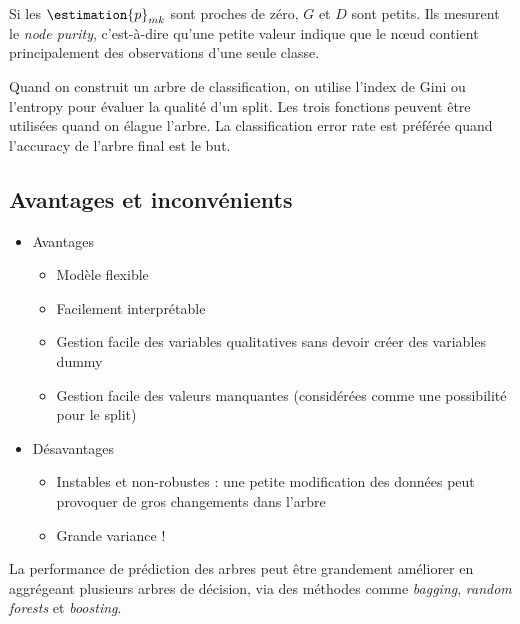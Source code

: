        Si les \(\estimation{p}_{mk}\) sont proches de zéro, \(G\) et \(D\) sont petits. Ils mesurent le \textit{node purity}, c'est-à-dire qu'une petite valeur indique que le nœud contient principalement des observations d'une seule classe.

        Quand on construit un arbre de classification, on utilise l'index de Gini ou l'entropy pour évaluer la qualité d'un split. Les trois fonctions peuvent être utilisées quand on élague l'arbre. La classification error rate est préférée quand l'accuracy de l'arbre final est le but.

    \subsection{Avantages et inconvénients}
        \begin{itemize}
            \item Avantages
            \begin{itemize}
                \item Modèle flexible
                \item Facilement interprétable
                \item Gestion facile des variables qualitatives sans devoir créer des variables dummy
                \item Gestion facile des valeurs manquantes (considérées comme une possibilité pour le split)
            \end{itemize}
            \item Désavantages
            \begin{itemize}
                \item Instables et non-robustes : une petite modification des données peut provoquer de gros changements dans l'arbre
                \item Grande variance !
            \end{itemize}
        \end{itemize}

        La performance de prédiction des arbres peut être grandement améliorer en aggrégeant plusieurs arbres de décision, via des méthodes comme \textit{bagging}, \textit{random forests} et \textit{boosting}.

